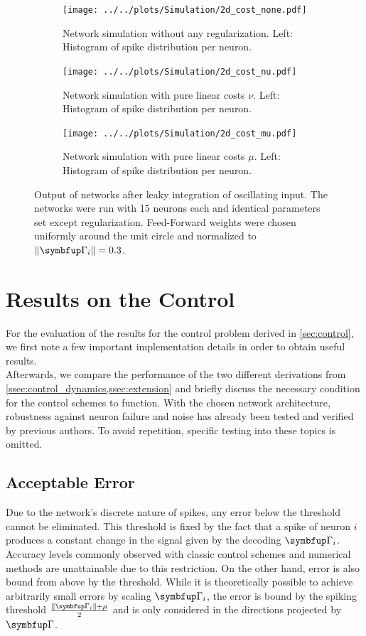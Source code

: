 \begin{figure}[h!]
	\centering
	\begin{subfigure}[t]{0.6\textwidth}
		\centering
		\texttt{[image: ../../plots/Simulation/2d\_cost\_none.pdf]}
		\caption{Network simulation without any regularization. Left: Histogram of spike distribution per neuron.}
		\label{fig:sim_no_cost}
	\end{subfigure}
	\hfill
	\begin{subfigure}[t]{0.6\textwidth}
		\centering
		\texttt{[image: ../../plots/Simulation/2d\_cost\_nu.pdf]}
		\caption{Network simulation with pure linear costs $\nu$. Left: Histogram of spike distribution per neuron.}
		\label{fig:sim_nu_cost}
	\end{subfigure}
	\hfill
	\begin{subfigure}[t]{0.6\textwidth}
		\centering
		\texttt{[image: ../../plots/Simulation/2d\_cost\_mu.pdf]}
		\caption{Network simulation with pure linear costs $\mu$. Left: Histogram of spike distribution per neuron.}
		\label{fig:sim_mu_cost}
	\end{subfigure}
	\caption{Output of networks after leaky integration of oscillating input. The networks were run with 15 neurons each and identical parameters set except regularization. Feed-Forward weights were chosen uniformly around the unit circle and normalized to $\|\bmu{\Gamma}_i\| = 0.3$.}
	\label{fig:sim_res_4}
\end{figure}




\section{Results on the Control}\label{sec:res_control}
For the evaluation of the results for the control problem derived in \cref{sec:control}, we first note a few important implementation details in order to obtain useful results. \\
Afterwards, we compare the performance of the two different derivations from \cref{ssec:control_dynamics,ssec:extension} and briefly discuss the necessary condition for the control schemes to function. With the chosen network architecture, robustness against neuron failure and noise has already been tested and verified by previous authors. To avoid repetition, specific testing into these topics is omitted.
\subsection{Acceptable Error}
Due to the network's discrete nature of spikes, any error below the threshold cannot be eliminated. This threshold is fixed by the fact that a spike of neuron $i$ produces a constant change in the signal given by the decoding $\bmu{\Gamma}_i$. Accuracy levels commonly observed with classic control schemes and numerical methods are unattainable due to this restriction. On the other hand, error is also bound from above by the threshold. While it is theoretically possible to achieve arbitrarily small errors by scaling $\bmu{\Gamma}_i$, the error is bound by the spiking threshold  $\frac{\|\bmu{\Gamma}_i\| + \mu}{2}$ and is only considered in the directions projected by $\bmu{\Gamma}$.


